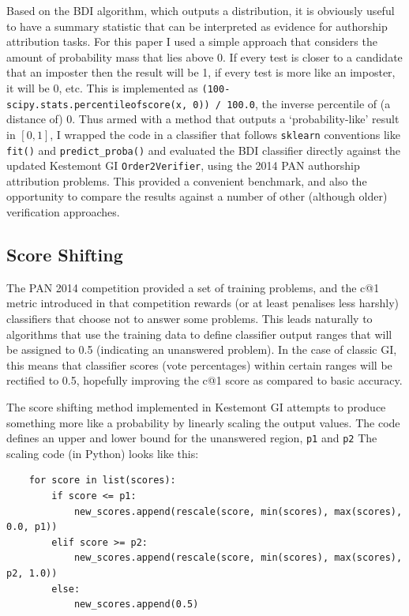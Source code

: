 \documentclass[
    hf
]{ceurart}
\begin{document}
Based on the BDI algorithm, which outputs a distribution, it is obviously useful
to have a summary statistic that can be interpreted as evidence for authorship
attribution tasks. For this paper I used a simple approach that considers the
amount of probability mass that lies above 0. If every test is closer to a
candidate that an imposter then the result will be 1, if every test is more like
an imposter, it will be 0, etc. This is implemented as
\texttt{(100-scipy.stats.percentileofscore(x, 0)) / 100.0}, the inverse
percentile of (a distance of) 0. Thus armed with a method that outputs a
`probability-like' result in $[0,1]$, I wrapped the code in a classifier that
follows \texttt{sklearn} \cite{scikit-learn} conventions like \texttt{fit()} and
\texttt{predict\_proba()}  and evaluated the BDI classifier directly against the
updated Kestemont GI \texttt{Order2Verifier}, using the 2014 PAN authorship
attribution problems. This provided a convenient benchmark, and also the
opportunity to compare the results against a number of other (although older)
verification approaches.

\subsection{Score Shifting}

The PAN 2014 competition provided a set of training problems, and the c@1 metric
introduced in that competition rewards (or at least penalises less harshly)
classifiers that choose not to answer some problems. This leads naturally to
algorithms that use the training data to define classifier output ranges that
will be assigned to 0.5 (indicating an unanswered problem). In the case of
classic GI, this means that classifier scores (vote percentages) within certain
ranges will be rectified to 0.5, hopefully improving the c@1 score as compared
to basic accuracy.

The score shifting method implemented in Kestemont GI attempts to produce
something more like a probability by linearly scaling the output values. The
code defines an upper and lower bound for the unanswered region, \texttt{p1} and
\texttt{p2} The scaling code (in Python) looks like this:

\begin{verbatim}
    for score in list(scores):
        if score <= p1:
            new_scores.append(rescale(score, min(scores), max(scores), 0.0, p1))
        elif score >= p2:
            new_scores.append(rescale(score, min(scores), max(scores), p2, 1.0))
        else:
            new_scores.append(0.5)
\end{verbatim}
\end{document}

